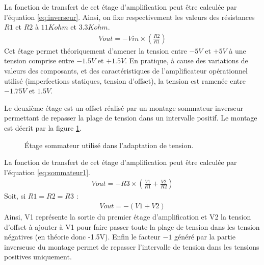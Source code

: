 \documentclass[letterpaper, twoside, 12pt, memoire, creativecommons, hyperref]{thETS}
\begin{document}
La fonction de transfert de cet étage d'amplification peut être calculée par l'équation \ref{eq:inverseur}. Ainsi, on fixe respectivement les valeurs des résistances $R1$ et $R2$ à $11Kohm$ et $3.3Kohm$.
\begin{align}\label{eq:inverseur}
   Vout = -Vin \times ( \frac{R2}{R1} )
\end{align}
Cet étage permet théoriquement d'amener la tension entre $-5V$ et $+5V$ à une tension comprise entre $-1.5V$ et $+1.5V$. En pratique, à cause des variations de valeurs des composants, et des caractéristiques de l'amplificateur opérationnel utilisé (imperfections statiques, tension d'offset), la tension est ramenée entre $-1.75V$ et $1.5V$.

Le deuxième étage est un offset réalisé par un montage sommateur inverseur permettant de repasser la plage de tension dans un intervalle positif. Le montage est décrit par la figure \ref{fig:sommateur1}. 

\begin{figure}
	\centering
	\caption{Étage sommateur utilisé dans l'adaptation de tension.}
	\label{fig:sommateur1}
\end{figure}

La fonction de transfert de cet étage d'amplification peut être calculée par l'équation \ref{eq:sommateur1}. 
\begin{align}\label{eq:sommateur1}
   Vout = -R3 \times ( \frac{V1}{R1} + \frac{V2}{R2})
\end{align}
Soit, si $R1 = R2 = R3$ : 
\begin{align}\label{eq:sommateur2}
   Vout = -(V1 + V2)
\end{align}
Ainsi, V1 représente la sortie du premier étage d'amplification et V2 la tension d'offset à ajouter à V1 pour faire passer toute la plage de tension dans les tension négatives (en théorie donc -1.5V). Enfin le facteur $-1$ généré par la partie inverseuse du montage permet de repasser l'intervalle de tension dans les tensions positives uniquement.
\end{document}
